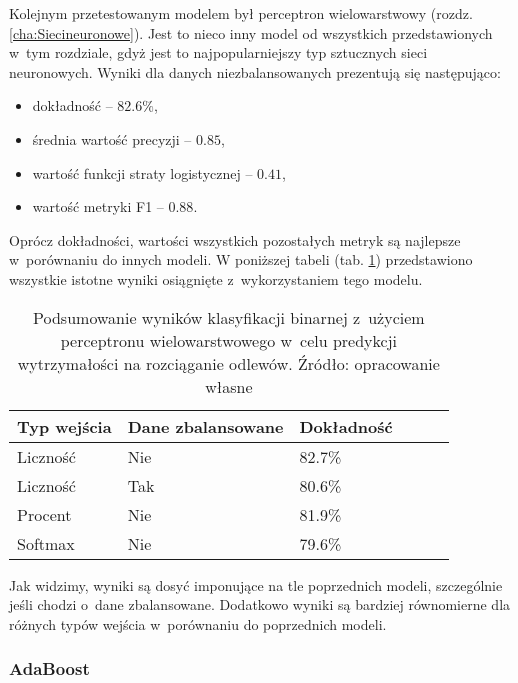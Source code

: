 Kolejnym przetestowanym modelem był perceptron wielowarstwowy (rozdz. \ref{cha:Siecineuronowe}). Jest to nieco inny model od wszystkich przedstawionych w~tym rozdziale, gdyż jest to najpopularniejszy typ sztucznych sieci neuronowych. Wyniki dla danych niezbalansowanych prezentują się następująco:
\begin{itemize}
	\item dokładność – $82.6\%$,
	\item średnia wartość precyzji – $0.85$,
	\item wartość funkcji straty logistycznej – $0.41$,
	\item wartość metryki F1 – $0.88$.
\end{itemize}
Oprócz dokładności, wartości wszystkich pozostałych metryk są najlepsze w~porównaniu do innych modeli.
W poniższej tabeli (tab. \ref{mlp.summary.table}) przedstawiono wszystkie istotne wyniki osiągnięte z~wykorzystaniem tego modelu.
\begin{table}[h]
	\centering
	\begin{threeparttable}
		\caption{Podsumowanie wyników klasyfikacji binarnej z~użyciem perceptronu wielowarstwowego w~celu predykcji wytrzymałości na rozciąganie odlewów. Źródło: opracowanie własne}
		\label{mlp.summary.table}
		\begin{tabularx}{1\textwidth}{ |X|X|X|X|X|X| }
		  \hline
		  \textbf{Typ wejścia} & \textbf{Dane zbalansowane} & \textbf{Dokładność}  \\
		  \hline

	          Liczność & Nie & 82.7\%\\
		  \hline

	          Liczność & Tak & 80.6\%\\
		  \hline

	          Procent & Nie & 81.9\%\\
		  \hline

	          Softmax & Nie & 79.6\%\\
		  \hline
		\end{tabularx}
	\end{threeparttable}
\end{table}
Jak widzimy, wyniki są dosyć imponujące na tle poprzednich modeli, szczególnie jeśli chodzi o~dane zbalansowane. Dodatkowo wyniki są bardziej równomierne dla różnych typów wejścia w~porównaniu do poprzednich modeli.

\subsubsection{AdaBoost}
\label{structures.with.AdaBoost}

